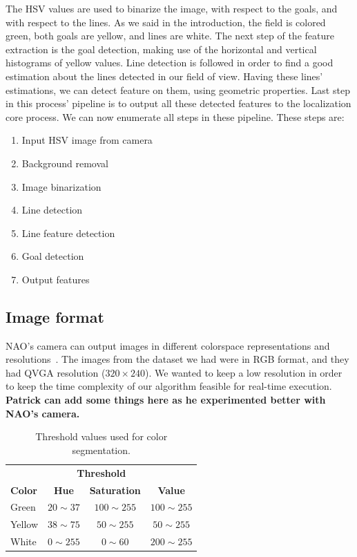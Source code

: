 \documentclass[	DIV=calc,%
							paper=a4,%
							fontsize=9pt,%
							twocolumn]{scrartcl}	 					%
\begin{document}
The HSV values are used to binarize the image, with respect to the goals, and with respect to the lines. As we said in the introduction, the field is colored green, both goals are yellow, and lines are white. The next step of the feature extraction is the goal detection, making use of the horizontal and vertical histograms of yellow values. Line detection is followed in order to find a good estimation about the lines detected in our field of view. Having these lines' estimations, we can detect feature on them, using geometric properties. Last step in this process' pipeline is to output all these detected features to the localization core process. We can now enumerate all steps in these pipeline. These steps are:
\begin{enumerate}
\item Input HSV image from camera
\item Background removal
\item Image binarization
\item Line detection
\item Line feature detection
\item Goal detection
\item Output features
\end{enumerate}

\subsection{Image format}
NAO's camera can output images in different colorspace representations and resolutions~\cite{NaoCam}. The images from the dataset we had were in RGB format, and they had QVGA resolution ($320 \times 240$). We wanted to keep a low resolution in order to keep the time complexity of our algorithm feasible for real-time execution. \textbf{Patrick can add some things here as he experimented better with NAO's camera.}

\begin{table}
\begin{center}
\caption{Threshold values used for color segmentation.}
\label{thresholdHSV}
\begin{tabular}{lccc}
\toprule
\multicolumn{4}{c}{\textbf{Threshold}} \\
\cmidrule(r){2-4}
\textbf{Color}   & \textbf{Hue} & \textbf{Saturation} & \textbf{Value} \\
\midrule
Green      & $20 \sim 37$    & $100 \sim 255$    & $100 \sim 255$    \\
Yellow      & $38 \sim 75$    & $50 \sim 255$    & $50 \sim 255$    \\
White     & $0 \sim 255$    & $0 \sim 60$    & $200 \sim 255$    \\
\bottomrule
\end{tabular}
\end{center}
\end{table}
\end{document}
